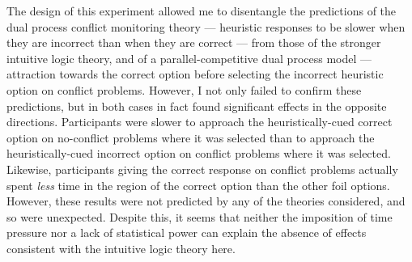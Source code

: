 The design of this experiment allowed me to disentangle
the predictions of the dual process conflict monitoring theory
--- heuristic responses to be slower when
they are incorrect than when they are correct ---
from those of the stronger intuitive logic theory,
and of a parallel-competitive dual process model
--- attraction towards the correct option
before selecting the incorrect heuristic option on conflict problems.
However, I not only failed to confirm these predictions,
but in both cases in fact found significant effects in the opposite directions.
Participants were slower to approach the heuristically-cued correct option
on no-conflict problems where it was selected
than to approach the heuristically-cued incorrect option
on conflict problems where it was selected.
Likewise, participants giving the correct response on conflict problems
actually spent \emph{less} time in the region of the correct option
than the other foil options.
However, these results were not predicted by any of the theories considered,
and so were unexpected.
Despite this, it seems that neither the imposition of time pressure
nor a lack of statistical power
can explain the absence of effects
consistent with the intuitive logic theory here.

